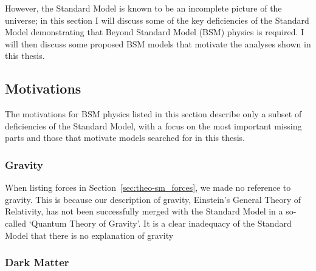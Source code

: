 However, the Standard Model is known to be an incomplete picture of the universe;
in this section I will discuss some of the key deficiencies of the Standard Model demonstrating
that Beyond Standard Model (BSM) physics is required.
I will then discuss some proposed BSM models that motivate the analyses shown in this thesis.

\subsection{Motivations}

The motivations for BSM physics listed in this section
describe only a subset of deficiencies of the Standard Model,
with a focus on the most important missing parts and
those that motivate models searched for in this thesis.

\subsubsection{Gravity}

When listing forces in Section~\ref{sec:theo-sm_forces}, we made no reference to gravity.
This is because our description of gravity, Einstein's General Theory of Relativity,
has not been successfully merged with the Standard Model in a so-called `Quantum Theory of Gravity'.
It is a clear inadequacy of the Standard Model that there is no explanation of gravity

\subsubsection{Dark Matter}
\label{sec:theo_bsm_dm}



